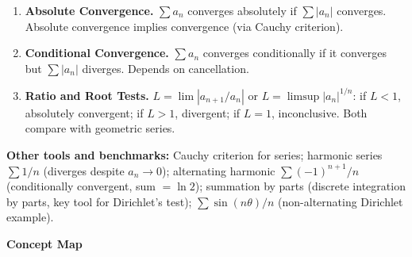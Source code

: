\documentclass[worksheet]{workbook}
\begin{document}
\begin{enumerate}[label=\textbf{\Alph*.}, leftmargin=2.5em, itemsep=1pt]
\item \textbf{Absolute Convergence.}  $\sum a_n$ converges absolutely if $\sum |a_n|$ converges.  Absolute convergence implies convergence (via Cauchy criterion).

\item \textbf{Conditional Convergence.}  $\sum a_n$ converges conditionally if it converges but $\sum |a_n|$ diverges.  Depends on cancellation.

\item \textbf{Ratio and Root Tests.}  $L = \lim |a_{n+1}/a_n|$ or $L = \limsup |a_n|^{1/n}$: if $L < 1$, absolutely convergent; if $L > 1$, divergent; if $L = 1$, inconclusive.  Both compare with geometric series.

\end{enumerate}

\normalsize

\medskip

\noindent\textbf{Other tools and benchmarks:} Cauchy criterion for series; harmonic series $\sum 1/n$ (diverges despite $a_n \to 0$); alternating harmonic $\sum (-1)^{n+1}/n$ (conditionally convergent, sum $= \ln 2$); summation by parts (discrete integration by parts, key tool for Dirichlet's test); $\sum \sin(n\theta)/n$ (non-alternating Dirichlet example).


\newpage
\begin{center}
{\large\bfseries\color{maroon} Concept Map}
\end{center}
\end{document}
